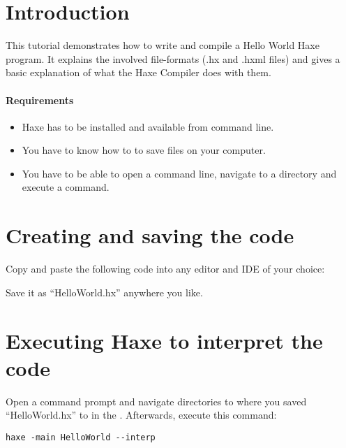 \label{hello-world}

\section*{Introduction}
\label{hello-world-introduction}

This tutorial demonstrates how to write and compile a Hello World Haxe program. It explains the involved file-formats (.hx and .hxml files) and gives a basic explanation of what the Haxe Compiler does with them.

\paragraph{Requirements}

\begin{itemize}
	\item Haxe has to be installed and available from command line.
	\item You have to know how to to save files on your computer.
	\item You have to be able to open a command line, navigate to a directory and execute a command.
\end{itemize}

\section*{Creating and saving the code}
\label{hello-world-code}

Copy and paste the following code into any editor and IDE of your choice:


Save it as ``HelloWorld.hx'' anywhere you like.

\section*{Executing Haxe to interpret the code}
\label{hello-world-executing}

Open a command prompt and navigate directories to where you saved ``HelloWorld.hx'' to in the . Afterwards, execute this command:

\begin{lstlisting}
haxe -main HelloWorld --interp
\end{lstlisting}